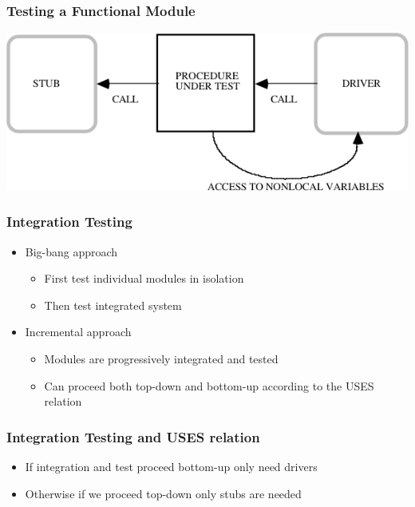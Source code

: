 \documentclass[t,12pt,numbers,fleqn]{beamer}
\begin{document}

\begin{frame}
\frametitle{Testing a Functional Module \cite{GhezziEtAl2003}}

\includegraphics[scale=0.5]{../Figures/TestingAFunctModule.png}

\end{frame}


\begin{frame}
\frametitle{Integration Testing}

\begin{itemize}
\item Big-bang approach
\begin{itemize}
\item First test individual modules in isolation
\item Then test integrated system
\end{itemize}
\item Incremental approach
\begin{itemize}
\item Modules are progressively integrated and tested
\item Can proceed both top-down and bottom-up according to the USES relation
\end{itemize}
\end{itemize}
\end{frame}


\begin{frame}
\frametitle{Integration Testing and USES relation}

\begin{itemize}
\item If integration and test proceed bottom-up only need drivers
\item Otherwise if we proceed top-down only stubs are needed
\end{itemize}
\end{frame}
\end{document}
